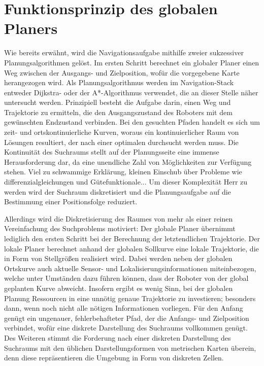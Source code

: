 \section{Funktionsprinzip des globalen Planers}
Wie bereits erwähnt, wird die Navigationsaufgabe mithilfe zweier sukzessiver Planungsalgorithmen gelöst. Im ersten Schritt berechnet ein globaler Planer einen Weg zwischen der Ausgangs- und Zielposition, wofür die vorgegebene Karte herangezogen wird. Als Planungsalgorithmus werden im Navigation-Stack entweder Dijkstra- oder der A*-Algorithmus verwendet, die an dieser Stelle näher untersucht werden. Prinzipiell besteht die Aufgabe darin, einen Weg und Trajektorie zu ermitteln, die den Ausgangszustand des Roboters mit dem gewünschten Endzustand verbinden. Bei den gesuchten Pfaden handelt es sich um zeit- und ortskontinuierliche Kurven, woraus ein kontinuierlicher Raum von Lösungen resultiert, der nach einer optimalen durchsucht werden muss. Die Kontinuität des Suchraums stellt auf der Planungsseite eine immense Herausforderung dar, da eine unendliche Zahl von Möglichkeiten zur Verfügung stehen. {\color{red} Viel zu schwammige Erklärung, kleinen Einschub über Probleme wie differenzialgleichungen und Gütefunktionale...} Um dieser Komplexität Herr zu werden wird der Suchraum diskretisiert und die Planungsaufgabe auf die Bestimmung einer Positionsfolge reduziert.

Allerdings wird die Diskretisierung des Raumes von mehr als einer reinen Vereinfachung des Suchproblems motiviert: Der globale Planer übernimmt lediglich den ersten Schritt bei der Berechnung der letztendlichen Trajektorie. Der lokale Planer berechnet anhand der globalen Sollkurve eine lokale Trajektorie, die in Form von Stellgrößen realisiert wird. Dabei werden neben der globalen Ortskurve auch aktuelle Sensor- und Lokalisierungsinformationen miteinbezogen, welche unter Umständen dazu führen können, dass der Roboter von der global geplanten Kurve abweicht. Insofern ergibt es wenig Sinn, bei der globalen Planung Ressourcen in eine unnötig genaue Trajektorie zu investieren; besonders dann, wenn noch nicht alle nötigen Informationen vorliegen. Für den Anfang genügt ein ungenauer, fehlerbehafteter Pfad, der die Anfangs- und Zielposition verbindet, wofür eine diskrete Darstellung des Suchraums vollkommen genügt. Des Weiteren stimmt die Forderung nach einer diskreten Darstellung des Suchraums mit den üblichen Darstellungsformen von metrischen Karten überein, denn diese repräsentieren die Umgebung in Form von diskreten Zellen.

